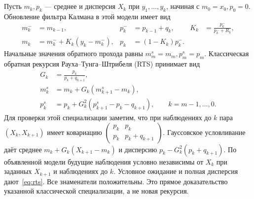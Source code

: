 \subsection{}
{Пусть $m_k,p_k$ --- среднее и дисперсия $X_k$ при $y_1,\ldots,y_k$, начиная с $m_0=x_0,p_0=0$. Обновление фильтра Калмана в этой модели имеет вид}
\begin{equation}\label{eq:filter}
\begin{aligned}
m_k^-&=m_{k-1},&p_k^-&=p_{k-1}+q_k,& K_k&=\frac{p_k^-}{p_k^-+R_k},\\
m_k&=m_k^-+K_k(y_k-m_k^-),&p_k&=(1-K_k)p_k^-.
\end{aligned}
\end{equation}
{Начальные значения обратного прохода равны $m_m^s=m_m,p_m^s=p_m$. Классическая обратная рекурсия Рауха--Тунга--Штрибеля (RTS) \cite[Section 3.2]{RauchTungStriebel1965}\cite[Section 12.2, Theorem 12.2]{SarkkaSvensson2023} принимает вид}
\begin{equation}\label{eq:rts}
\begin{aligned}
G_k&=\frac{p_k}{p_k+q_{k+1}},\\
m_k^s&=m_k+G_k(m_{k+1}^s-m_k),\\
p_k^s&=p_k+G_k^2(p_{k+1}^s-p_k-q_{k+1}),\qquad k=m-1,\ldots,0.
\end{aligned}
\end{equation}
{Для проверки этой специализации заметим, что при наблюдениях до $k$ пара $(X_k,X_{k+1})$ имеет ковариацию $\left(\begin{smallmatrix}p_k&p_k\\p_k&p_k+q_{k+1}\end{smallmatrix}\right)$. Гауссовское условливание даёт среднее $m_k+G_k(X_{k+1}-m_k)$ и дисперсию $p_k-G_k^2(p_k+q_{k+1})$. По объявленной модели будущие наблюдения условно независимы от $X_k$ при заданных $X_{k+1}$ и наблюдениях до $k$. Условное ожидание и полная дисперсия дают~\eqref{eq:rts}. Все знаменатели положительны. Это прямое доказательство указанной классической специализации, а не новая рекурсия.}

